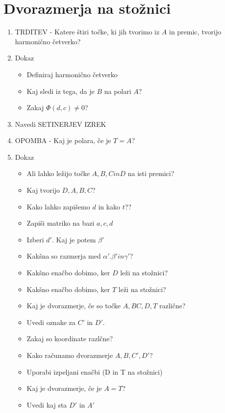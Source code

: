 \documentclass{article}
\begin{document}
    \section{Dvorazmerja na stožnici}
    \begin{enumerate}
        \item TRDITEV - Katere štiri točke, ki jih tvorimo iz $A$ in premic, tvorijo harmonično četverko?
        \item Dokaz
        \begin{itemize}
            \item Definiraj harmonično četverko
            \item Kaj sledi iz tega, da je $B$ na polari $A$?
            \item Zakaj $\Phi(d, c) \neq 0$?
        \end{itemize}
        \item Navedi SETINERJEV IZREK
        \item OPOMBA - Kaj je polara, če je $T = A$?
        \item Dokaz
        \begin{itemize}
            \item Ali lahko ležijo točke $A, B, C in D$ na isti premici?
            \item Kaj tvorijo ${D, A, B, C}$?
            \item Kako lahko zapišemo $d$ in kako $t$??
            \item Zapiši matriko na bazi ${a, c, d}$
            \item Izberi $d'$. Kaj je potem $\beta'$
            \item Kakšna so razmerja med $\alpha'. \beta' in \gamma'$?
            \item Kakšno enačbo dobimo, ker $D$ leži na stožnici?
            \item Kakšno enačbo dobimo, ker $T$ leži na stožnici?
            \item Kaj je dvorazmerje, če so točke $A, B C, D, T$ različne?
            \item Uvedi oznake za $C'$ in $D'$. 
            \item Zakaj so koordinate razlčne?
            \item Kako računamo dvorazmerje $A, B, C', D'$?
            \item Uporabi izpeljani enačbi (D in T na stožnici)
            \item Kaj je dvorazmerje, če je $A = T$?
            \item Uvedi kaj sta $D'$ in $A'$

\end{itemize}
\end{enumerate}
\end{document}
